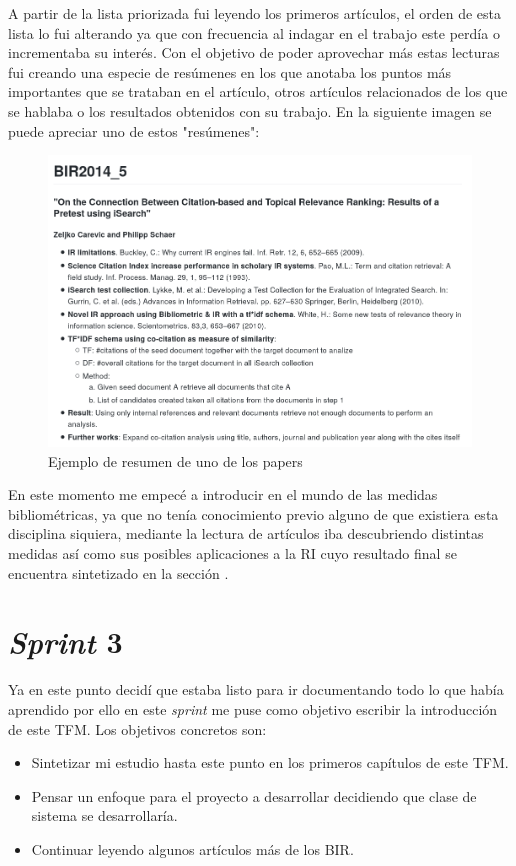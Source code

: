 A partir de la lista priorizada fui leyendo los primeros artículos, el orden de esta lista lo fui alterando ya que con frecuencia al indagar en el trabajo este perdía o incrementaba su interés. Con el objetivo de poder aprovechar más estas lecturas fui creando una especie de resúmenes en los que anotaba los puntos más importantes que se trataban en el artículo, otros artículos relacionados de los que se hablaba o los resultados obtenidos con su trabajo. En la siguiente imagen se puede apreciar uno de estos "resúmenes":

\begin{figure}[h!]
	
	\centering
	\includegraphics[width=\linewidth]{imagenes/paper_sumary}
	\caption{Ejemplo de resumen de uno de los papers}
\end{figure}

En este momento me empecé a introducir en el mundo de las medidas bibliométricas, ya que no tenía conocimiento previo alguno de que existiera esta disciplina siquiera, mediante la lectura de artículos iba descubriendo distintas medidas así como sus posibles aplicaciones a la \acrshort{RI} cuyo resultado final se encuentra sintetizado en la sección .

\section{\textit{Sprint} 3}
Ya en este punto decidí que estaba listo para ir documentando todo lo que había aprendido por ello en este \textit{sprint} me puse como objetivo escribir la introducción de este \acrshort{TFM}. Los objetivos concretos son:
\begin{itemize}
	\item Sintetizar mi estudio hasta este punto en los primeros capítulos de este \acrshort{TFM}.
	\item Pensar un enfoque para el proyecto a desarrollar decidiendo que clase de sistema se desarrollaría.
	\item Continuar leyendo algunos artículos más de los \acrshort{BIR}.
\end{itemize}

